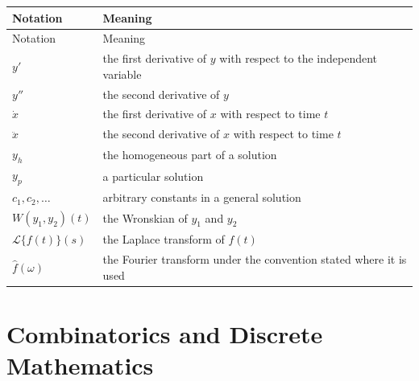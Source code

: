     {\small
    \renewcommand{\arraystretch}{1.18}
    \begin{longtable}{@{}L{0.27\textwidth}L{0.65\textwidth}@{}}
        \toprule
        Notation & Meaning \\
        \midrule
        \endfirsthead

        \toprule
        Notation & Meaning \\
        \midrule
        \endhead

        \bottomrule
        \endlastfoot

        $y'$ & the first derivative of $y$ with respect to the independent variable \\
        $y''$ & the second derivative of $y$ \\
        $\dot{x}$ & the first derivative of $x$ with respect to time $t$ \\
        $\ddot{x}$ & the second derivative of $x$ with respect to time $t$ \\
        $y_h$ & the homogeneous part of a solution \\
        $y_p$ & a particular solution \\
        $c_1,c_2,\dots$ & arbitrary constants in a general solution \\
        $W(y_1,y_2)(t)$ & the Wronskian of $y_1$ and $y_2$ \\
        $\mathcal{L}\{f(t)\}(s)$ & the Laplace transform of $f(t)$ \\
        $\widehat{f}(\omega)$ & the Fourier transform under the convention stated where it is used \\
    \end{longtable}
    }

    \section*{Combinatorics and Discrete Mathematics}

